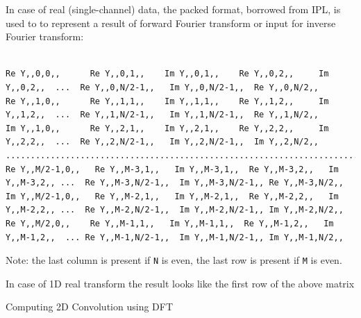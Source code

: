 In case of real (single-channel) data, the packed format, borrowed from IPL, is used to to represent a result of forward Fourier transform or input for inverse Fourier transform:

\begin{lstlisting}

Re Y,,0,0,,      Re Y,,0,1,,    Im Y,,0,1,,    Re Y,,0,2,,     Im Y,,0,2,,  ...  Re Y,,0,N/2-1,,   Im Y,,0,N/2-1,,  Re Y,,0,N/2,,
Re Y,,1,0,,      Re Y,,1,1,,    Im Y,,1,1,,    Re Y,,1,2,,     Im Y,,1,2,,  ...  Re Y,,1,N/2-1,,   Im Y,,1,N/2-1,,  Re Y,,1,N/2,,
Im Y,,1,0,,      Re Y,,2,1,,    Im Y,,2,1,,    Re Y,,2,2,,     Im Y,,2,2,,  ...  Re Y,,2,N/2-1,,   Im Y,,2,N/2-1,,  Im Y,,2,N/2,,
............................................................................................
Re Y,,M/2-1,0,,   Re Y,,M-3,1,,   Im Y,,M-3,1,,  Re Y,,M-3,2,,   Im Y,,M-3,2,, ...  Re Y,,M-3,N/2-1,,  Im Y,,M-3,N/2-1,, Re Y,,M-3,N/2,,
Im Y,,M/2-1,0,,   Re Y,,M-2,1,,   Im Y,,M-2,1,,  Re Y,,M-2,2,,   Im Y,,M-2,2,, ...  Re Y,,M-2,N/2-1,,  Im Y,,M-2,N/2-1,, Im Y,,M-2,N/2,,
Re Y,,M/2,0,,    Re Y,,M-1,1,,   Im Y,,M-1,1,,  Re Y,,M-1,2,,   Im Y,,M-1,2,,  ... Re Y,,M-1,N/2-1,,  Im Y,,M-1,N/2-1,, Im Y,,M-1,N/2,,

\end{lstlisting}

Note: the last column is present if \texttt{N} is even, the last row is present if \texttt{M} is even.

In case of 1D real transform the result looks like the first row of the above matrix

Computing 2D Convolution using DFT

